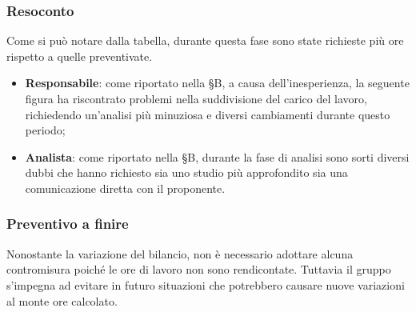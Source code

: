 \vspace{-1cm}

\subsubsection{Resoconto}
Come si può notare dalla tabella, durante questa fase sono state richieste più ore rispetto a quelle preventivate.
\begin{itemize}
\item \textbf{Responsabile}: come riportato nella \S B, a causa dell'inesperienza, la seguente figura ha riscontrato problemi nella suddivisione del carico del lavoro, richiedendo un'analisi più minuziosa e diversi cambiamenti durante questo periodo;
\item \textbf{Analista}: come riportato nella \S B, durante la fase di analisi sono sorti diversi dubbi che hanno richiesto sia uno studio più approfondito sia una comunicazione diretta con il proponente.
\end{itemize}
\subsubsection{Preventivo a finire}
Nonostante la variazione del bilancio, non è necessario adottare alcuna contromisura poiché le ore di lavoro non sono rendicontate. Tuttavia il gruppo s'impegna ad evitare in futuro situazioni che potrebbero causare nuove variazioni al monte ore calcolato.
